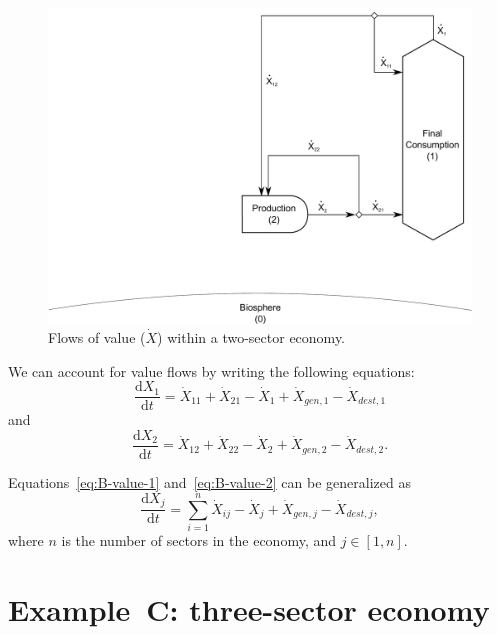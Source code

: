 \begin{landscape}
\begin{figure}[!ht]
\centering
\includegraphics[width=0.8\linewidth]{Part_2/Chapter_Values/images/2_sector_value.pdf}
\caption[Flows of value within a two-sector economy]{Flows of value ($\dot{X}$) within a two-sector economy.}
\label{fig:B_value}
\end{figure}
\end{landscape}

We can account for value flows by writing
the following equations:
%
\begin{equation}\label{eq:B-value-1}
	\frac{\mathrm{d}X_{1}}{\mathrm{d}t}
	= \dot{X}_{11}
	+ \dot{X}_{21}
	- \dot{X}_{1}
	+ \dot{X}_{gen,1}
	- \dot{X}_{dest,1}
\end{equation}
%
and
%
\begin{equation}\label{eq:B-value-2}
	\frac{\mathrm{d}X_{2}}{\mathrm{d}t}
	= \dot{X}_{12}
	+ \dot{X}_{22}
	- \dot{X}_{2}
	+ \dot{X}_{gen,2}
	- \dot{X}_{dest,2}.
\end{equation}

Equations~\ref{eq:B-value-1} and~\ref{eq:B-value-2}
can be generalized as
%
\begin{equation}\label{eq:B-value-generalized}
	\frac{\mathrm{d}X_{j}}{\mathrm{d}t}
	= \sum\limits_{i=1}^n \dot{X}_{ij}
	- \dot{X}_{j}
	+ \dot{X}_{gen,j}
	- \dot{X}_{dest,j},
\end{equation}
%
where $n$ is the number of sectors in the economy, and $j \in [1, n]$.


\section{Example~C: three-sector economy} %
\label{sec:value_example_C}

